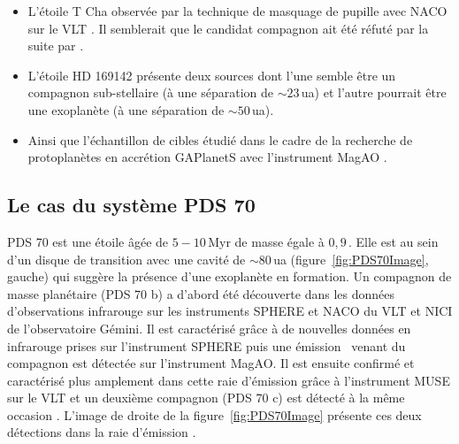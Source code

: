 \begin{itemize}
    \item L'étoile T Cha observée par la technique de masquage de pupille avec \ac{NACO} sur le \ac{VLT} \citep{huelamo2011}. Il semblerait que le candidat compagnon ait été réfuté par la suite par \cite{olofsson2013}.

    \item L'étoile HD 169142 présente deux sources \citep{quanz2013b, biller2014, reggiani2014} dont l'une semble être un compagnon sub-stellaire (à une séparation de $\sim 23 \,$ua) et l'autre pourrait être une exoplanète (à une séparation de $\sim 50 \,$ua).
    
    \item Ainsi que l'échantillon de cibles étudié dans le cadre de la recherche de protoplanètes en accrétion \ac{GAPlanetS} avec l'instrument \ac{MagAO} \citep{follette2022}.
\end{itemize}


\subsection{Le cas du système PDS 70}
\label{sec:pds70}

PDS 70 est une étoile âgée de $5 - 10 \,$Myr de masse égale à $0,9 \,$\MS. Elle est au sein d'un disque de transition avec une cavité de $\sim 80 \,$ua (figure~\ref{fig:PDS70Image}, gauche) qui suggère la présence d'une exoplanète en formation. Un compagnon de masse planétaire (PDS 70 b) a d'abord été découverte \citep{keppler2018} dans les données d'observations infrarouge sur les instruments \ac{SPHERE} et \ac{NACO} du \ac{VLT} et \ac{NICI} de l'observatoire Gémini. Il est caractérisé grâce à de nouvelles données en infrarouge prises sur l'instrument \ac{SPHERE} \citep{muller2018} puis une émission \ha~venant du compagnon est détectée \citep{wagner2018} sur l'instrument \ac{MagAO}. Il est ensuite confirmé et caractérisé plus amplement dans cette raie d'émission grâce à l'instrument \ac{MUSE} sur le \ac{VLT} et un deuxième compagnon (PDS 70 c) est détecté à la même occasion \citep{haffert2019}. L'image de droite de la figure~\ref{fig:PDS70Image} présente ces deux détections dans la raie d'émission \ha.

